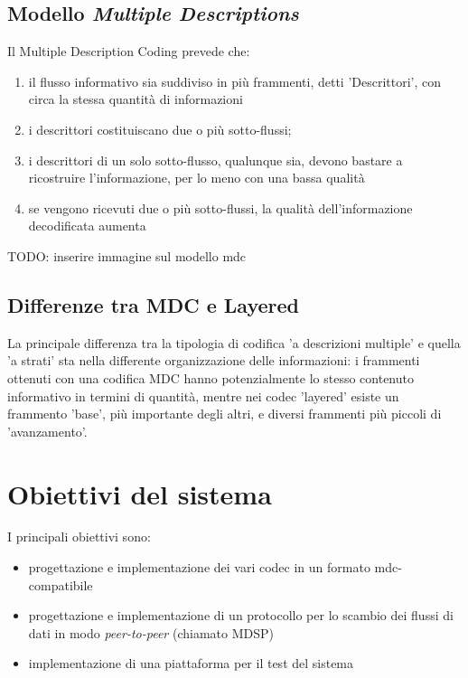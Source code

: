 
\subsection{Modello \emph{Multiple Descriptions}}

Il Multiple Description Coding prevede che:
\begin{enumerate}
\item il flusso informativo sia suddiviso in più frammenti, detti 'Descrittori', con circa la stessa quantità di informazioni
\item i descrittori costituiscano due o più sotto-flussi;
\item i descrittori di un solo sotto-flusso, qualunque sia, devono bastare a ricostruire l'informazione, per lo meno con una bassa qualità
\item se vengono ricevuti due o più sotto-flussi, la qualità dell'informazione decodificata aumenta 
\end{enumerate}

TODO: inserire immagine sul modello mdc

\subsection{Differenze tra MDC e Layered}

La principale differenza tra la tipologia di codifica 'a descrizioni multiple' e
quella 'a strati' sta nella differente organizzazione delle informazioni: i
frammenti ottenuti con una codifica MDC hanno potenzialmente lo stesso contenuto
informativo in termini di quantità, mentre nei codec 'layered' esiste un
frammento 'base', più importante degli altri, e diversi frammenti più piccoli di
'avanzamento'.

\section{Obiettivi del sistema}

I principali obiettivi sono:

\begin{itemize}
\item progettazione e implementazione dei vari codec in un formato mdc-compatibile
\item progettazione e implementazione di un protocollo per lo scambio dei
flussi di dati in modo \emph{peer-to-peer} (chiamato MDSP)
\item implementazione di una piattaforma per il test del sistema
\end{itemize}







